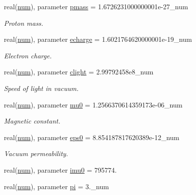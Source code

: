 \begin{DoxyCompactItemize}
real(\hyperlink{namespaceconstants_afe19f7f8af171411c51fb763b36e3823}{num}), parameter \hyperlink{namespaceconstants_a44f3d8cbf9c39db63d7533d985cc51c3}{pmass} = 1.\+6726231000000001e-\/27\+\_\+num
\begin{DoxyCompactList}\small\item\em Proton mass. \end{DoxyCompactList}\item 
real(\hyperlink{namespaceconstants_afe19f7f8af171411c51fb763b36e3823}{num}), parameter \hyperlink{namespaceconstants_af0f1098f6be55eab4174890ed5caaf98}{echarge} = 1.\+6021764620000001e-\/19\+\_\+num
\begin{DoxyCompactList}\small\item\em Electron charge. \end{DoxyCompactList}\item 
real(\hyperlink{namespaceconstants_afe19f7f8af171411c51fb763b36e3823}{num}), parameter \hyperlink{namespaceconstants_ac23d8857383002cada2aa571fd859533}{clight} = 2.\+99792458e8\+\_\+num
\begin{DoxyCompactList}\small\item\em Speed of light in vacuum. \end{DoxyCompactList}\item 
real(\hyperlink{namespaceconstants_afe19f7f8af171411c51fb763b36e3823}{num}), parameter \hyperlink{namespaceconstants_adf2453bfeefbefa1135a81f4ddfe4d6d}{mu0} = 1.\+2566370614359173e-\/06\+\_\+num
\begin{DoxyCompactList}\small\item\em Magnetic constant. \end{DoxyCompactList}\item 
real(\hyperlink{namespaceconstants_afe19f7f8af171411c51fb763b36e3823}{num}), parameter \hyperlink{namespaceconstants_a4fc609b4d7bd5d8e45e57bd0ba7c5e29}{eps0} = 8.\+854187817620389e-\/12\+\_\+num
\begin{DoxyCompactList}\small\item\em Vacuum permeability. \end{DoxyCompactList}\item 
real(\hyperlink{namespaceconstants_afe19f7f8af171411c51fb763b36e3823}{num}), parameter \hyperlink{namespaceconstants_abcf10ccefe6023e0401ce1b4a5f74fb5}{imu0} = 795774.
\item 
real(\hyperlink{namespaceconstants_afe19f7f8af171411c51fb763b36e3823}{num}), parameter \hyperlink{namespaceconstants_a736c2860cb0585043ad4abcd1c3352b1}{pi} = 3.\+\_\+num

\end{DoxyCompactItemize}
